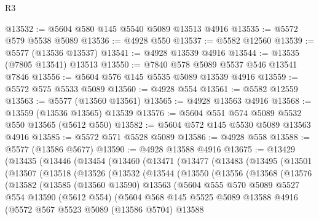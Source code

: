 \begin{lexlean}{R3}
\begin{coremodule}
@13532 := @5604 @580 @145 @5540 @5089 @13513 @4916
@13535 := @5572 @579 @5538 @5089
@13536 := @4928 @550
@13537 := @5582 @12560
@13539 := @5577 (@13536 @13537)
@13541 := @4928 @13539 @4916
@13544 := @13535 (@7805 @13541) @13513
@13550 := @7840 @578 @5089 @5537 @546 @13541 @7846
@13556 := @5604 @576 @145 @5535 @5089 @13539 @4916
@13559 := @5572 @575 @5533 @5089
@13560 := @4928 @554
@13561 := @5582 @12559
@13563 := @5577 (@13560 @13561)
@13565 := @4928 @13563 @4916
@13568 := @13559 (@13536 @13565) @13539
@13576 := @5604 @551 @574 @5089 @5532 @550 @13565 (@5612 @550)
@13582 := @5604 @572 @145 @5530 @5089 @13563 @4916
@13585 := @5572 @571 @5528 @5089
@13586 := @4928 @558
@13588 := @5577 (@13586 @5677)
@13590 := @4928 @13588 @4916
@13675 := @13429
    (@13435
      (@13446
        (@13454
          (@13460
            (@13471
              (@13477
                (@13483
                  (@13495
                    (@13501
                      (@13507
                        (@13518
                          (@13526
                            (@13532
                              (@13544
                                (@13550
                                  (@13556
                                    (@13568
                                      (@13576
                                        (@13582
                                          (@13585
                                            (@13560 @13590)
                                            @13563
                                            (@5604
                                              @555
                                              @570
                                              @5089
                                              @5527
                                              @554
                                              @13590
                                              (@5612 @554)
                                              (@5604
                                                @568
                                                @145
                                                @5525
                                                @5089
                                                @13588
                                                @4916
                                                (@5572
                                                  @567
                                                  @5523
                                                  @5089
                                                  (@13586 @5704)
                                                  @13588

\end{coremodule}
\end{lexlean}
